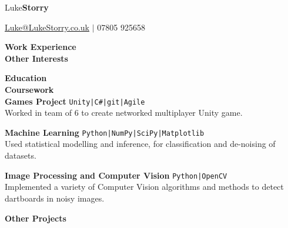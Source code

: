 \documentclass[10pt]{article}
\newcommand{\sect}[1]{{\LARGE{\textbf{#1}}}\vspace{0.1em}\\}
\newcommand{\zz}[3]{{\large\textbf{#1}} \hfill {\small \colorbox{boxcol}{\texttt{#3}} }\\{#2}\vspace{0.5em}}
\newcommand{\li}{\textcolor{linecol}{|}}
\begin{document}
\begin{center}
{\Huge{{Luke}\textbf{Storry}}}

{\large \href{mailto:Luke@LukeStorry.co.uk}{Luke@LukeStorry.co.uk} $|$ 07805 925658}\\

{\textcolor{linecol}\hrulefill}
\end{center}
\begin{minipage}[t]{0.28\textwidth} 




\sect{Work Experience}

\sect{Other Interests}



\end{minipage} 
\hfill
\begin{minipage}[t]{0.7\textwidth} 
\sect{Education}

\sect{Coursework}

\zz{Games Project}
{Worked in team of 6 to create networked multiplayer Unity game.}{Unity\li C\#\li git\li Agile}

\zz{Machine Learning}
{Used statistical modelling and inference, for classification and de-noising of datasets.}{Python\li NumPy\li SciPy\li Matplotlib}

\zz{Image Processing and Computer Vision}
{Implemented a variety of Computer Vision algorithms and methods to detect dartboards in noisy images.}{Python\li OpenCV}

\sect{Other Projects}


\end{minipage} 
\end{document}
